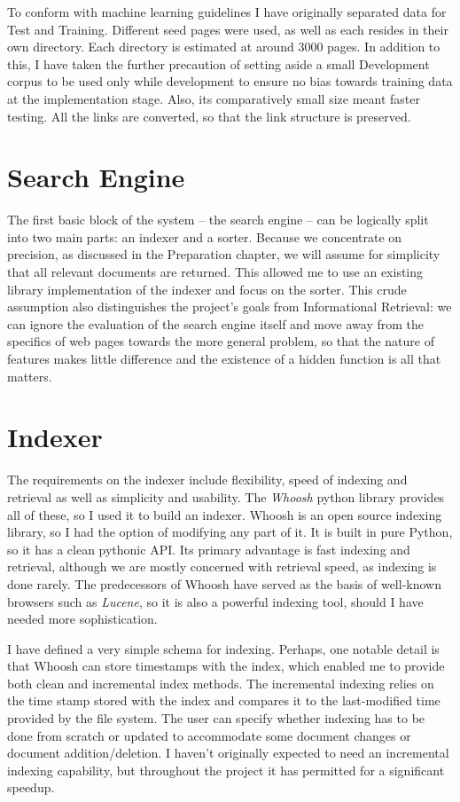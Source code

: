 \documentclass[12pt,notitlepage,twoside]{scrreprt}
\begin{document}
To conform with machine learning guidelines I have originally separated data
for Test and Training. Different seed pages were used, as well as each resides
in their own directory. Each directory is estimated at around 3000 pages. In
addition to this, I have taken the further precaution of setting aside a small
Development corpus to be used only while development to ensure no bias towards
training data at the implementation stage. Also, its comparatively small size
meant faster testing. All the links are converted, so that the link structure
is preserved.

\section{Search Engine}

The first basic block of the system -- the search engine -- can be logically
split into two main parts: an indexer and a sorter. Because we concentrate on
precision, as discussed in the Preparation chapter, we will assume for
simplicity that all relevant documents are returned. This allowed me to use an 
existing library implementation of the indexer and focus on the sorter.
This crude assumption also distinguishes the project's goals from Informational
Retrieval: we can ignore the evaluation of the search engine itself and move
away from the specifics of web pages towards the more general problem, so that
the nature of features makes little difference and the existence of a hidden
function is all that matters.

\section{Indexer}

The requirements on the indexer include flexibility, speed of indexing and
retrieval as well as simplicity and usability.  The \textit{Whoosh} python
library provides all of these, so I used it to build an indexer. Whoosh is an
open source indexing library, so I had the option of modifying any part of it.
It is  built in pure Python, so it has a clean pythonic API. Its primary
advantage is fast indexing and retrieval, although we are mostly concerned with
retrieval speed, as indexing is done rarely. The predecessors of Whoosh have
served as the basis of well-known browsers such as \textit{Lucene}, so it is
also a powerful indexing tool, should I have needed more sophistication.

I have defined a very simple schema for indexing. Perhaps, one notable detail
is that Whoosh can store timestamps with the index, which enabled me to provide
both clean and incremental index methods. The incremental indexing relies on
the time stamp stored with the index and compares it to the last-modified time
provided by the file system. The user can specify whether indexing has to be
done from scratch or updated to accommodate some document changes or document
addition/deletion. I haven't originally expected to need an incremental
indexing capability, but throughout the project it has permitted for a
significant speedup.
\end{document}

